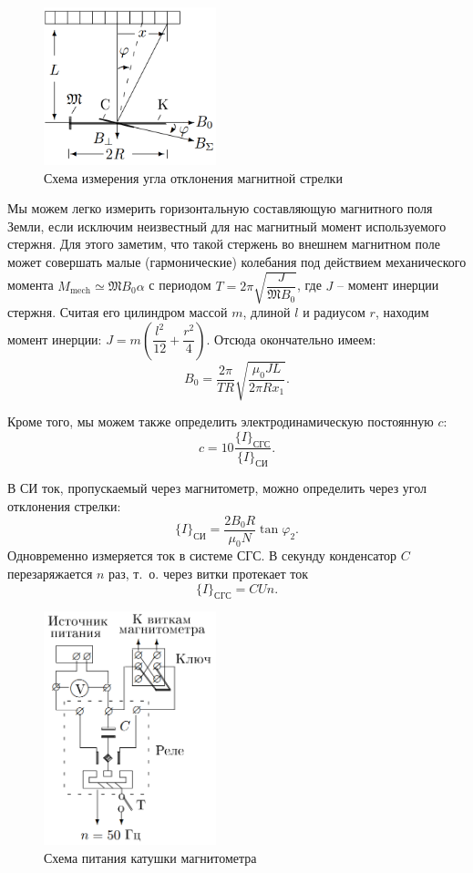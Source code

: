 \documentclass{../lab_class}
\newcommand{\magm}{\mathfrak{M}}
\begin{document}
\begin{figure}
\centering
\includegraphics[width=5cm]{Fig2.png}
\caption{Схема измерения угла отклонения магнитной стрелки}
\end{figure}

Мы можем легко измерить горизонтальную составляющую магнитного поля Земли, если исключим неизвестный для нас магнитный момент используемого стержня. Для этого заметим, что такой стержень во внешнем магнитном поле может совершать малые (гармонические) колебания под действием механического момента $M_{\text{mech}} \simeq \magm B_0 \alpha$ с периодом $T = 2\pi \sqrt{ \dfrac{J}{\magm B_0} }$, где $J$ -- момент инерции стержня. Считая его цилиндром массой $m$, длиной $l$ и радиусом $r$, находим момент инерции: $J = m \left( \dfrac{l^2}{12} + \dfrac{r^2}{4} \right)$. Отсюда окончательно имеем:
$$
	B_0 = \dfrac{2\pi}{TR} \sqrt{ \dfrac{\mu_0 J L}{2\pi R x_1} }.
$$

Кроме того, мы можем также определить электродинамическую постоянную $c$:
$$
	c = 10 \dfrac{\{ I \}_{\text{СГС}}}{ \{ I \}_{\text{СИ}}}.
$$

В СИ ток, пропускаемый через магнитометр, можно определить через угол отклонения стрелки:
$$
	\{ I \}_{\text{СИ}} = \dfrac{2 B_0 R}{\mu_0 N} \tan{\varphi_2}.
$$
Одновременно измеряется ток в системе СГС. В секунду конденсатор $C$ перезаряжается $n$ раз, т.~о. через витки протекает ток
$$
	\{ I \}_{\text{СГС}} = C U n.
$$

\begin{figure}
\centering
\includegraphics[width=5cm]{Fig3.png}
\caption{Схема питания катушки магнитометра}
\end{figure}
\end{document}
